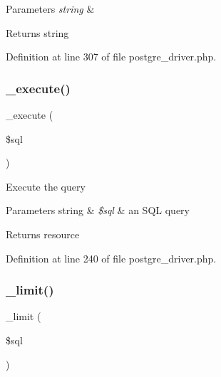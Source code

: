\begin{DoxyParams}{Parameters}
{\em string} & \\
\hline
\end{DoxyParams}
\begin{DoxyReturn}{Returns}
string 
\end{DoxyReturn}


Definition at line 307 of file postgre\+\_\+driver.\+php.

\mbox{\label{class_c_i___d_b__postgre__driver_a114ab675d89bf8324a41785fb475e86d}} 
\subsubsection{\texorpdfstring{\_execute()}{\_execute()}}
{\footnotesize\ttfamily \+\_\+execute (\begin{DoxyParamCaption}\item[{}]{\$sql }\end{DoxyParamCaption})\hspace{0.3cm}{\ttfamily [protected]}}

Execute the query


\begin{DoxyParams}[1]{Parameters}
string & {\em \$sql} & an S\+QL query \\
\hline
\end{DoxyParams}
\begin{DoxyReturn}{Returns}
resource 
\end{DoxyReturn}


Definition at line 240 of file postgre\+\_\+driver.\+php.

\mbox{\label{class_c_i___d_b__postgre__driver_a3a02ea06541b8ecc25a33a61651562c8}} 
\subsubsection{\texorpdfstring{\_limit()}{\_limit()}}
{\footnotesize\ttfamily \+\_\+limit (\begin{DoxyParamCaption}\item[{}]{\$sql }\end{DoxyParamCaption})\hspace{0.3cm}{\ttfamily [protected]}}

